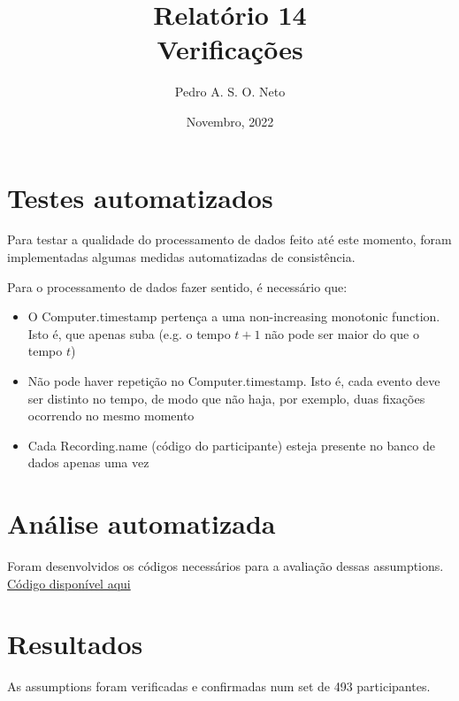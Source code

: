 \documentclass{article}
\title{Relatório 14 \\ Verificações}
\author{Pedro A. S. O. Neto}
\date{Novembro, 2022}
\begin{document}
\maketitle

\section{Testes automatizados}

Para testar a qualidade do processamento de dados feito até este momento, foram implementadas algumas medidas automatizadas de consistência.

Para o processamento de dados fazer sentido, é necessário que:
  
\begin{itemize}
  \item O Computer.timestamp pertença a uma non-increasing monotonic function. Isto é, que apenas suba (e.g. o tempo $t+1$ não pode ser maior do que o tempo $t$)
  \item Não pode haver repetição no Computer.timestamp. Isto é, cada evento deve ser distinto no tempo, de modo que não haja, por exemplo, duas fixações ocorrendo no mesmo momento
  \item Cada Recording.name (código do participante) esteja presente no banco de dados apenas uma vez
\end{itemize}

\section{Análise automatizada}

Foram desenvolvidos os códigos necessários para a avaliação dessas assumptions. \href{https://github.com/pasoneto/EyeTracking/tree/master/code/verificacoes/assumptions}{Código disponível aqui}

\section{Resultados}

As assumptions foram verificadas e confirmadas num set de 493 participantes.
\end{document}
